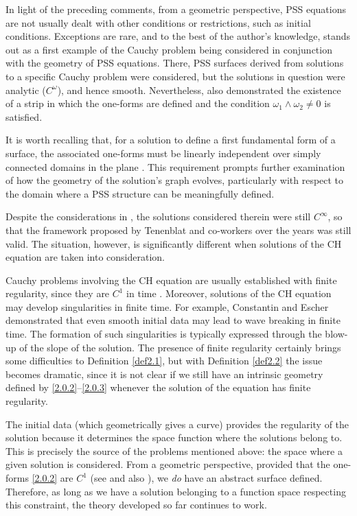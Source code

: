 \documentclass{cimart}
\begin{document}
In light of the preceding comments, from a geometric perspective, PSS equations are not usually dealt with other conditions or restrictions, such as initial conditions. Exceptions are rare, and to the best of the author's knowledge, \cite{nazime} stands out as a first example of the Cauchy problem being considered in conjunction with the geometry of PSS equations. There, PSS surfaces derived from solutions to a specific Cauchy problem were considered, but the solutions in question were analytic ($C^\omega$), and hence smooth. Nevertheless, \cite{nazime} also demonstrated the existence of a strip in which the one-forms are defined and the condition $\omega_1 \wedge \omega_2 \neq 0$ is satisfied.

It is worth recalling that, for a solution to define a first fundamental form of a surface, the associated one-forms must be linearly independent over simply connected domains in the plane \cite[Theorem 4.39]{cle}. This requirement prompts further examination of how the geometry of the solution's graph evolves, particularly with respect to the domain where a PSS structure can be meaningfully defined.

Despite the considerations in \cite{nazime}, the solutions considered therein were still $C^\infty$, so that the framework proposed by Tenenblat and co-workers over the years was still valid. The situation, however, is significantly different when solutions of the CH equation are taken into consideration.

Cauchy problems involving the CH equation are usually established with finite regularity, since they are $C^1$ in time \cite{const1998-1,const1998-2,const2000-1, CE}. Moreover, solutions of the CH equation may develop singularities in finite time. For example, Constantin and Escher \cite[Example 4.3]{const1998-2} demonstrated that even smooth initial data may lead to wave breaking in finite time. The formation of such singularities is typically expressed through the blow-up of the slope of the solution. The presence of finite regularity certainly brings some difficulties to Definition \ref{def2.1}, but with Definition \ref{def2.2} the issue becomes dramatic, since it is not clear if we still have an intrinsic geometry defined by \eqref{2.0.2}--\eqref{2.0.3} whenever the solution of the equation has finite regularity. 

The initial data (which geometrically gives a curve) provides the regularity of the solution because it determines the space function where the solutions belong to. This is precisely the source of the problems mentioned above: the space where a given solution is considered. From a geometric perspective, provided that the one-forms \eqref{2.0.2} are $C^1$ (see \cite[Theorem 10-19, page 232]{gug} and also \cite[Theorem 10-18, page 232]{gug}), we \textit{do} have an abstract surface defined. Therefore, as long as we have a solution belonging to a function space respecting this constraint, the theory developed so far continues to work.
\end{document}

